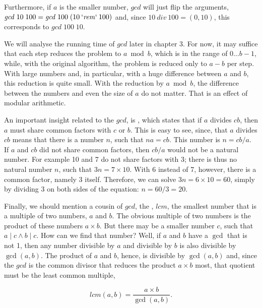 \documentclass{scrreprt}
\newcommand{\Varid}[1]{\mathit{#1}}
\begin{document}
Furthermore, if $a$ is the smaller number,
\ensuremath{\Varid{gcd}} will just flip the arguments,
\eg\: \ensuremath{\Varid{gcd}\;\mathrm{10}\;\mathrm{100}\mathrel{=}\Varid{gcd}\;\mathrm{100}\;(\mathrm{10}\mathbin{\Varid{`rem`}}\mathrm{100})}
and, since $10~div~100 = (0,10)$,
this corresponds to \ensuremath{\Varid{gcd}\;\mathrm{100}\;\mathrm{10}}.

We will analyse the running time of \ensuremath{\Varid{gcd}} 
later in chapter 3.
For now, it may suffice that
each step reduces the problem 
to $a \bmod b$, which is in the range
of $0 \dots b-1$,
while, with the original algorithm,
the problem is reduced only to $a - b$ per step.
With large numbers and, in particular, with a huge difference
between $a$ and $b$, this reduction is quite small.
With the reduction by $a \bmod b$,
the difference between the numbers and even the size of $a$
do not matter.
That is an effect of modular arithmetic.

An important insight related to the \ensuremath{\Varid{gcd}},
is , which states that
if $a$ divides $cb$, then $a$ must share
common factors with $c$ or $b$.
This is easy to see, since, that $a$
divides $cb$ means that there is a number $n$,
such that $na = cb$. This number is
$n = cb/a$. If $a$ and $cb$ did not share
common factors, then $cb/a$ would not be 
a natural number.
For example 10 and 7 do not share factors
with 3; there is thus no natural number
$n$, such that $3n = 7 \times 10$.
With 6 instead of 7, however, there is a common factor,
namely 3 itself. Therefore,
we can solve $3n = 6 \times 10 = 60$,
simply by dividing 3 on both sides
of the equation: $n = 60/3 = 20$.

Finally, we should mention a cousin of \ensuremath{\Varid{gcd}},
the , \ensuremath{\Varid{lcm}},
the smallest number that is a multiple 
of two numbers, $a$ and $b$.
The obvious multiple of two numbers
is the product of these numbers $a \times b$.
But there may be a smaller number $c$,
such that $a \mid c \wedge b \mid c$.
How can we find that number?
Well, if $a$ and $b$ have a $\gcd$ that is not 1,
then any number divisible by $a$ and divisible by $b$
is also divisible by $\gcd(a,b)$.
The product of $a$ and $b$, hence,
is divisible by $\gcd(a,b)$
and, since the \ensuremath{\Varid{gcd}} is the common divisor
that reduces the product $a \times b$ most,
that quotient must be the least common multiple, \ie

\begin{equation}
lcm(a,b) = \frac{a \times b}{\gcd(a,b)}.
\end{equation}
\end{document}
